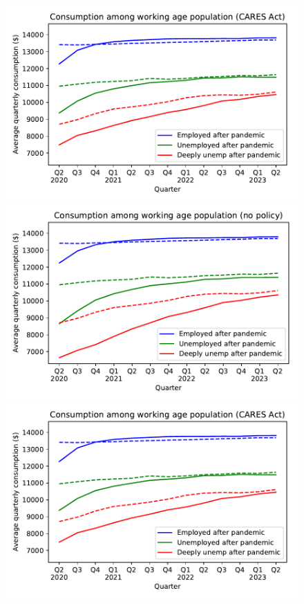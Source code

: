 \documentclass[titlepage]{\econtex}
\begin{document}
\begin{figure}
{    \includegraphics[width=8in]{./Figures/ConRespByEmpStateWStim}
  } %
  { \includegraphics[width=8in]{./Figures/ConRespByEmpStateNoStim}
    \includegraphics[width=8in]{./Figures/ConRespByEmpStateWStim}}
\end{figure}
\end{document}
